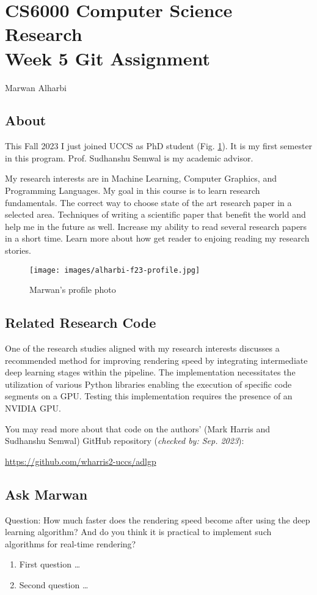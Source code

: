 
\section{CS6000 Computer Science Research\\ {\sc Week 5 Git Assignment}} 

\begin{center}
    Marwan Alharbi
\end{center}


\subsection{About}
This Fall 2023 I just joined UCCS as PhD student (Fig. \ref{img:alharbi:profile}). It is my first semester in 
this program. Prof. Sudhanshu Semwal is my academic advisor.

My research interests are in Machine Learning, Computer Graphics, and Programming 
Languages. My goal in this course is to learn research fundamentals. The correct 
way to choose state of the art research paper in a selected area. Techniques 
of writing a scientific paper that benefit the world and help me in the future as 
well. Increase my ability to read several research papers in a short time. Learn 
more about how get reader to enjoing reading my research stories.

\begin{figure}[h]
    \centerline{\texttt{[image: images/alharbi-f23-profile.jpg]}}
    \caption{Marwan's profile photo \label{img:alharbi:profile}} 
\end{figure}

\subsection{Related Research Code}
One of the research studies aligned with my research interests discusses a recommended 
method for improving rendering speed by integrating intermediate deep learning stages 
within the pipeline. The implementation necessitates the utilization of various Python
libraries enabling the execution of specific code segments on a GPU. Testing this 
implementation requires the presence of an NVIDIA GPU.

You may read more about that code on the authors' (Mark Harris and Sudhanshu Semwal) GitHub repository (\textit{checked by: Sep. 2023}):

\url{https://github.com/wharris2-uccs/adlgp}

\subsection{Ask Marwan}
Question: How much faster does the rendering speed become after using the deep learning algorithm? And do you think it is practical to implement such algorithms for real-time rendering? 

\begin{enumerate}[label={Question \arabic*.}]
    \item First question \dots
    \item Second question \dots
\end{enumerate}
